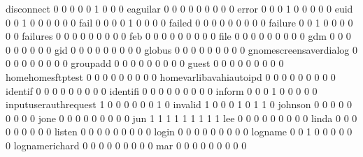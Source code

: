 \documentclass[compress,8pt]{beamer}
\begin{document}
\begin{frame}
\begin{Schunk}
  disconnect                                 0   0   0   0   0   1   0   0   0
  eaguilar                                   0   0   0   0   0   0   0   0   0
  error                                      0   0   0   1   0   0   0   0   0
  euid                                       0   0   1   0   0   0   0   0   0
  fail                                       0   0   0   0   1   0   0   0   0
  failed                                     0   0   0   0   0   0   0   0   0
  failure                                    0   0   1   0   0   0   0   0   0
  failures                                   0   0   0   0   0   0   0   0   0
  feb                                        0   0   0   0   0   0   0   0   0
  file                                       0   0   0   0   0   0   0   0   0
  gdm                                        0   0   0   0   0   0   0   0   0
  gid                                        0   0   0   0   0   0   0   0   0
  globus                                     0   0   0   0   0   0   0   0   0
  gnomescreensaverdialog                     0   0   0   0   0   0   0   0   0
  groupadd                                   0   0   0   0   0   0   0   0   0
  guest                                      0   0   0   0   0   0   0   0   0
  homehomesftptest                           0   0   0   0   0   0   0   0   0
  homevarlibavahiautoipd                     0   0   0   0   0   0   0   0   0
  identif                                    0   0   0   0   0   0   0   0   0
  identifi                                   0   0   0   0   0   0   0   0   0
  inform                                     0   0   0   1   0   0   0   0   0
  inputuserauthrequest                       1   0   0   0   0   0   0   1   0
  invalid                                    1   0   0   0   1   0   1   1   0
  johnson                                    0   0   0   0   0   0   0   0   0
  jone                                       0   0   0   0   0   0   0   0   0
  jun                                        1   1   1   1   1   1   1   1   1
  lee                                        0   0   0   0   0   0   0   0   0
  linda                                      0   0   0   0   0   0   0   0   0
  listen                                     0   0   0   0   0   0   0   0   0
  login                                      0   0   0   0   0   0   0   0   0
  logname                                    0   0   1   0   0   0   0   0   0
  lognamerichard                             0   0   0   0   0   0   0   0   0
  mar                                        0   0   0   0   0   0   0   0   0

\end{Schunk}
\end{frame}
\end{document}
